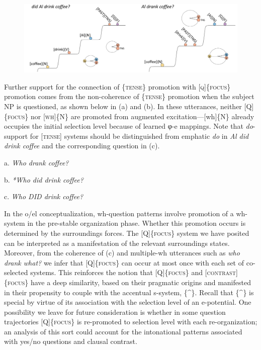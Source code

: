   
\begin{figure}
\includegraphics[width=\textwidth]{figures/Tilsen-img160.png}
\caption{\missingcaption}
\label{fig:}
\end{figure}
 

  Further support for the connection of \{\textsc{tense}\} promotion with [\textsc{q}]\{\textsc{focus}\} promotion comes from the non-coherence of \{\textsc{tense}\} promotion when the subject NP is questioned, as shown below in (a) and (b). In these utterances, neither [Q]\{\textsc{focus}\} nor [\textsc{wh}]\{N\} are promoted from augmented excitation—[wh]\{N\} already occupies the initial selection level because of learned φ-e mappings. Note that \textit{do}{}-support for [\textsc{tense}] systems should be distinguished from emphatic \textit{do} in \textit{Al did drink coffee} and the corresponding question in (c).  

  a.  \textit{Who drank coffee?} 

  b.  \textit{*Who did drink coffee?}

  c.  \textit{Who DID drink coffee?}

  In the o/el conceptualization, wh-question patterns involve promotion of a wh-system in the pre-stable organization phase. Whether this promotion occurs is determined by the surroundings forces. The [\textsc{Q}]\{\textsc{focus}\} system we have posited can be interpreted as a manifestation of the relevant surroundings states. Moreover, from the coherence of (c) and multiple-wh utterances such as \textit{who drank what?} we infer that [Q]\{\textsc{focus}\} can occur at most once with each set of co-selected systems. This reinforces the notion that [Q]\{\textsc{focus}\} and [\textsc{contrast}]\{\textsc{focus}\} have a deep similarity, based on their pragmatic origins and manifested in their propensity to couple with the accentual s-system, \{\^{}\}. Recall that \{\^{}\} is special by virtue of its association with the selection level of an e-potential. One possibility we leave for future consideration is whether in some question trajectories [Q]\{\textsc{focus}\} is re-promoted to selection level with each re-organization; an analysis of this sort could account for the intonational patterns associated with yes/no questions and clausal contrast.

